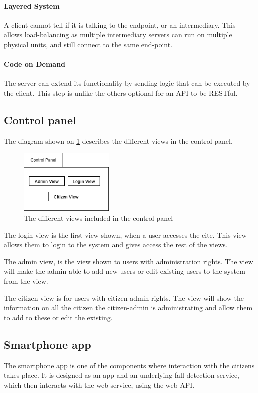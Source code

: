 \paragraph{Layered System} A client cannot tell if it is talking to the endpoint, or an intermediary. This allows load-balancing as multiple intermediary servers can run on multiple physical units, and still connect to the same end-point.

\paragraph{Code on Demand} The server can extend its functionality by sending logic that can be executed by the client. This step is unlike the others optional for an API to be RESTful.


\subsection{Control panel}
The diagram shown on \ref{fig:controlpanel} describes the different views in the control panel. 

\begin{figure}[H]
    \centering
    \includegraphics[width=0.4\textwidth]{Figures/ControlPanel.png}
    \caption{The different views included in the control-panel}
    \label{fig:controlpanel}
\end{figure}

The login view is the first view shown, when a user accesses the cite. This view allows them to login to the system and gives access the rest of the views.

The admin view, is the view shown to users with administration rights. The view will make the admin able to add new users or edit existing users to the system from the view.

The citizen view is for users with citizen-admin rights. The view will show the information on all the citizen the citizen-admin is administrating and allow them to add to these or edit the existing.

\subsection{Smartphone app}
The smartphone app is one of the components where interaction with the citizens takes place. It is designed as an app and an underlying fall-detection service, which then interacts with the web-service, using the web-API.



